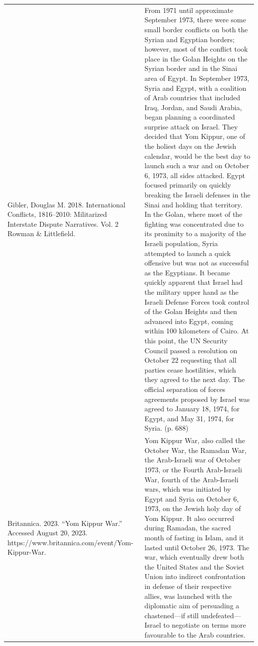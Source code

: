 {\begin{longtable}{p{}p{}}
Gibler, Douglas M. 2018. International Conflicts, 1816–2010: Militarized Interstate Dispute Narratives. Vol. 2 Rowman \& Littlefield. & From 1971 until approximate September 1973, there were some small border conflicts on both the Syrian and Egyptian borders; however, most of the conflict took place in the Golan Heights on the Syrian border and in the Sinai area of Egypt. In September 1973, Syria and Egypt, with a coalition of Arab countries that included Iraq, Jordan, and Saudi Arabia, began planning a coordinated surprise attack on Israel. They decided that Yom Kippur, one of the holiest days on the Jewish calendar, would be the best day to launch such a war and on October 6, 1973, all sides attacked. Egypt focused primarily on quickly breaking the Israeli defenses in the Sinai and holding that territory. In the Golan, where most of the fighting was concentrated due to its proximity to a majority of the Israeli population, Syria attempted to launch a quick offensive but was not as successful as the Egyptians. It became quickly apparent that Israel had the military upper hand as the Israeli Defense Forces took control of the Golan Heights and then advanced into Egypt, coming within 100 kilometers of Cairo. At this point, the UN Security Council passed a resolution on October 22 requesting that all parties cease hostilities, which they agreed to the next day. The official separation of forces agreements proposed by Israel was agreed to January 18, 1974, for Egypt, and May 31, 1974, for Syria. (p. 688)
\\
Britannica. 2023. “Yom Kippur War.” Accessed August 20, 2023. https://www.britannica.com/event/Yom-Kippur-War. & Yom Kippur War, also called the October War, the Ramadan War, the Arab-Israeli war of October 1973, or the Fourth Arab-Israeli War, fourth of the Arab-Israeli wars, which was initiated by Egypt and Syria on October 6, 1973, on the Jewish holy day of Yom Kippur. It also occurred during Ramadan, the sacred month of fasting in Islam, and it lasted until October 26, 1973. The war, which eventually drew both the United States and the Soviet Union into indirect confrontation in defense of their respective allies, was launched with the diplomatic aim of persuading a chastened—if still undefeated—Israel to negotiate on terms more favourable to the Arab countries.
\\

\end{longtable}}
